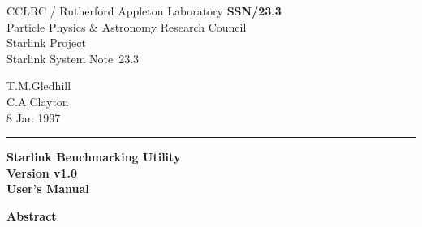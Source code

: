 \documentclass[11pt]{article}
\newcommand{\stardoccategory}  {Starlink System Note}
\newcommand{\stardocinitials}  {SSN}
\newcommand{\stardocnumber}    {23.3}
\newcommand{\stardocauthors}   {T.M.Gledhill \\
                                C.A.Clayton}
\newcommand{\stardocdate}      {8 Jan 1997}
\newcommand{\stardoctitle}     {Starlink Benchmarking Utility}
\newcommand{\stardocversion}   {Version \pkgver}
\newcommand{\stardocmanual}    {User's Manual}
\newcommand{\stardocname}{\stardocinitials /\stardocnumber}
\newenvironment{latexonly}{}{}
\newcommand{\pkgver}     {v1.0}
\begin{document}
\thispagestyle{empty}

\begin{latexonly}
   CCLRC / {\sc Rutherford Appleton Laboratory} \hfill {\bf \stardocname}\\
   {\large Particle Physics \& Astronomy Research Council}\\
   {\large Starlink Project\\}
   {\large \stardoccategory\ \stardocnumber}
   \begin{flushright}
   \stardocauthors\\
   \stardocdate
   \end{flushright}
   \vspace{-4mm}
   \rule{\textwidth}{0.5mm}
   \vspace{5mm}
   \vspace{5mm}
    \begin{center}
      {\Huge\bf  \stardoctitle \\ [2.5ex]}
      {\LARGE\bf \stardocversion \\ [4ex]}
      {\Huge\bf  \stardocmanual}
    \end{center}

   \vspace{10mm}
   \begin{center}
      {\Large\bf Abstract}
   \end{center}

\end{latexonly}
\end{document}
